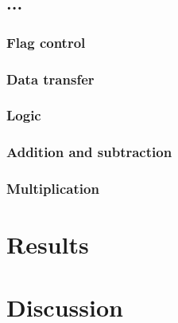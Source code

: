 \documentclass[a4paper,11pt]{kth-mag}
\begin{document}

\section{...}

\subsection{Flag control}


\subsection{Data transfer}


\subsection{Logic}


\subsection{Addition and subtraction}


\subsection{Multiplication}


\chapter{Results}
\label{ch:results}

\chapter{Discussion}
\label{ch:discussion}



\end{document}
